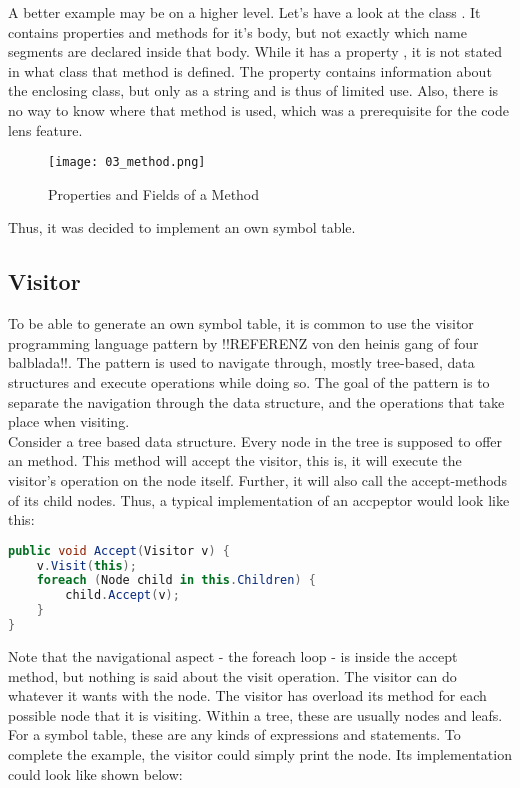 A better example may be on a higher level. Let's have a look at the class . It contains properties and methods for it's body, but not exactly which name segments are declared inside that body. While it has a property , it is not stated in what class that method is defined. The property  contains information about the enclosing class, but only as a string and is thus of limited use. Also, there is no way to know where that method is used, which was a prerequisite for the code lens feature.

\begin{figure}[h]
    \centering
    \texttt{[image: 03\_method.png]}
    \caption{Properties and Fields of a Method}
    \label{fig:method}
\end{figure}

Thus, it was decided to implement an own symbol table.

\subsection{Visitor}
To be able to generate an own symbol table, it is common to use the visitor programming language pattern by !!REFERENZ von den heinis gang of four balblada!!. The pattern is used to navigate through, mostly tree-based, data structures and execute operations while doing so. The goal of the pattern is to separate the navigation through the data structure, and the operations that take place when visiting.\\

Consider a tree based data structure. Every node in the tree is supposed to offer an  method. This method will accept the visitor, this is, it will execute the visitor's operation on the node itself. Further, it will also call the accept-methods of its child nodes. Thus, a typical implementation of an accpeptor would look like this:

\begin{lstlisting}[language=csharp, caption={Example for Accept}, captionpos=b, label={lst:accept}]
public void Accept(Visitor v) {
    v.Visit(this);
    foreach (Node child in this.Children) {
        child.Accept(v);
    }
}
\end{lstlisting}

Note that the navigational aspect - the foreach loop - is inside the accept method, but nothing is said about the visit operation. The visitor can do whatever it wants with the node. The visitor has overload its  method for each possible node that it is visiting. Within a tree, these are usually nodes and leafs. For a symbol table, these are any kinds of expressions and statements. To complete the example, the visitor could simply print the node. Its implementation could look like shown below:


